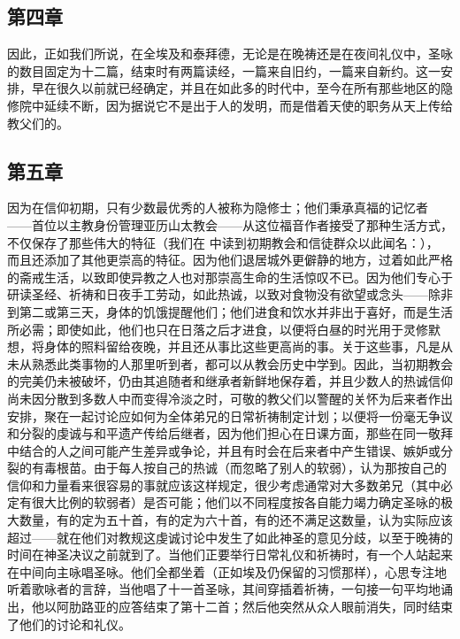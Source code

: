 
\subsection{第四章}

\par

因此，正如我们所说，在全埃及和泰拜德，无论是在晚祷还是在夜间礼仪中，圣咏的数目固定为十二篇，结束时有两篇读经，一篇来自旧约，一篇来自新约。这一安排，早在很久以前就已经确定，并且在如此多的时代中，至今在所有那些地区的隐修院中延续不断，因为据说它不是出于人的发明，而是借着天使的职务从天上传给教父们的。\par


\subsection{第五章}

\par

因为在信仰初期，只有少数最优秀的人被称为隐修士；他们秉承真福的记忆者 ——首位以主教身份管理亚历山太教会——从这位福音作者接受了那种生活方式，不仅保存了那些伟大的特征（我们在  中读到初期教会和信徒群众以此闻名：）， 而且还添加了其他更崇高的特征。因为他们退居城外更僻静的地方，过着如此严格的斋戒生活，以致即使异教之人也对那崇高生命的生活惊叹不已。因为他们专心于研读圣经、祈祷和日夜手工劳动，如此热诚，以致对食物没有欲望或念头——除非到第二或第三天，身体的饥饿提醒他们；他们进食和饮水并非出于喜好，而是生活所必需；即使如此，他们也只在日落之后才进食，以便将白昼的时光用于灵修默想，将身体的照料留给夜晚，并且还从事比这些更高尚的事。关于这些事，凡是从未从熟悉此类事物的人那里听到者，都可以从教会历史中学到。因此，当初期教会的完美仍未被破坏，仍由其追随者和继承者新鲜地保存着，并且少数人的热诚信仰尚未因分散到多数人中而变得冷淡之时，可敬的教父们以警醒的关怀为后来者作出安排，聚在一起讨论应如何为全体弟兄的日常祈祷制定计划；以便将一份毫无争议和分裂的虔诚与和平遗产传给后继者，因为他们担心在日课方面，那些在同一敬拜中结合的人之间可能产生差异或争论，并且有时会在后来者中产生错误、嫉妒或分裂的有毒根苗。由于每人按自己的热诚（而忽略了别人的软弱），认为那按自己的信仰和力量看来很容易的事就应该这样规定，很少考虑通常对大多数弟兄（其中必定有很大比例的软弱者）是否可能；他们以不同程度按各自能力竭力确定圣咏的极大数量，有的定为五十首，有的定为六十首，有的还不满足这数量，认为实际应该超过——就在他们对教规这虔诚讨论中发生了如此神圣的意见分歧，以至于晚祷的时间在神圣决议之前就到了。当他们正要举行日常礼仪和祈祷时，有一个人站起来在中间向主咏唱圣咏。他们全都坐着（正如埃及仍保留的习惯那样），心思专注地听着歌咏者的言辞，当他唱了十一首圣咏，其间穿插着祈祷，一句接一句平均地诵出，他以阿肋路亚的应答结束了第十二首；然后他突然从众人眼前消失，同时结束了他们的讨论和礼仪。\par

